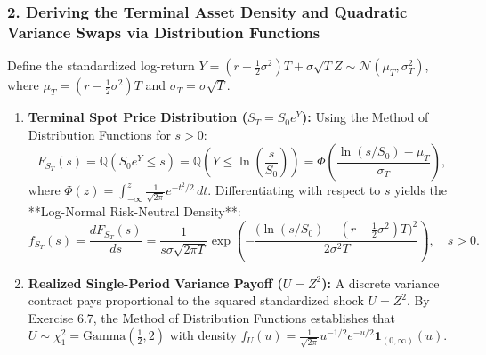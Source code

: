 \documentclass[11pt, letterpaper]{article}
\theoremstyle{definition}
\theoremstyle{remark}
\newcommand{\Q}{\mathbb{Q}}
\begin{document}
\subsubsection*{2. Deriving the Terminal Asset Density and Quadratic Variance Swaps via Distribution Functions}
Define the standardized log-return $Y = \left(r - \frac{1}{2}\sigma^2\right)T + \sigma\sqrt{T}Z \sim \mathcal{N}(\mu_T, \sigma_T^2)$, where $\mu_T = \left(r - \frac{1}{2}\sigma^2\right)T$ and $\sigma_T = \sigma\sqrt{T}$.
\begin{enumerate}
    \item \textbf{Terminal Spot Price Distribution ($S_T = S_0 e^Y$):} Using the Method of Distribution Functions for $s > 0$:
    \[
        F_{S_T}(s) = \Q(S_0 e^Y \le s) = \Q\left(Y \le \ln\left(\frac{s}{S_0}\right)\right) = \Phi\left( \frac{\ln(s/S_0) - \mu_T}{\sigma_T} \right),
    \]
    where $\Phi(z) = \int_{-\infty}^z \frac{1}{\sqrt{2\pi}}e^{-t^2/2}\,dt$. Differentiating with respect to $s$ yields the **Log-Normal Risk-Neutral Density**:
    \[
        f_{S_T}(s) = \frac{dF_{S_T}(s)}{ds} = \frac{1}{s\sigma\sqrt{2\pi T}} \exp\left( -\frac{\big(\ln(s/S_0) - (r - \frac{1}{2}\sigma^2)T\big)^2}{2\sigma^2 T} \right), \quad s > 0.
    \]
    \item \textbf{Realized Single-Period Variance Payoff ($U = Z^2$):} A discrete variance contract pays proportional to the squared standardized shock $U = Z^2$. By Exercise 6.7, the Method of Distribution Functions establishes that $U \sim \chi^2_1 = \text{Gamma}\left(\frac{1}{2}, 2\right)$ with density $f_U(u) = \frac{1}{\sqrt{2\pi}}u^{-1/2}e^{-u/2}\mathbf{1}_{(0,\infty)}(u)$.
\end{enumerate}
\end{document}
